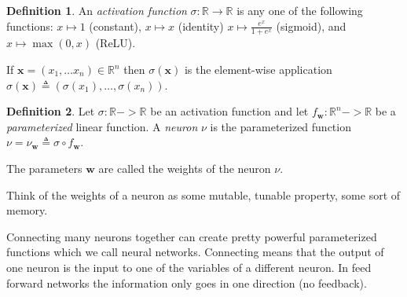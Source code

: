 \documentclass[11pt, a4paper]{report}
\theoremstyle{plain}
\theoremstyle{definition}
\newtheorem{mydef}{Definition}[chapter]
\theoremstyle{remark}
\newcommand{\R}{\mathbb{R}}
\newcommand{\x}{\mathbf{x}}
\newcommand{\w}{\mathbf{w}}
\begin{document}
\begin{mydef}
\label{def:activationfunction}
An \emph{activation function} $\sigma : \R \to \R$ is any one of the following functions:
$x \mapsto 1$ (constant), $x \mapsto x$ (identity)
$ x \mapsto \frac{e^x}{1 + e^x}$ (sigmoid), and $x \mapsto \max(0,x)$ (ReLU).

If $\x = (x_1, \dots x_n) \in \R^n$ then $\sigma(\x)$ is the element-wise application
$\sigma(\x) \triangleq (\sigma(x_1), \dots , \sigma(x_n))$.
\end{mydef}

\begin{mydef}
\label{def:neuron}
Let $\sigma : \R -> \R$ be an activation function and let $f_{\w} : \R^n -> \R$
be a \emph{parameterized} linear function. A \emph{neuron} $\nu$ is the
parameterized function 
$\nu =  \nu_{\w} \triangleq \sigma \circ
f_{\w}$.

The parameters $\w$ are called the weights of the neuron $\nu$.
\end{mydef}

Think of the weights of a neuron as some mutable, tunable property, some sort of memory.

Connecting many neurons together can create pretty powerful parameterized
functions which we call neural networks.
Connecting means that the output of one neuron is the input to one of the
variables of a different neuron.
In feed forward networks the information only goes in one direction (no
feedback).
\end{document}
